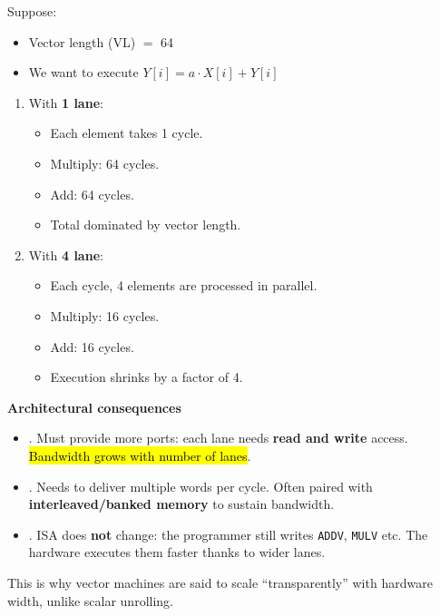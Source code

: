 \highspace
\begin{examplebox}
    Suppose:
    \begin{itemize}
        \item Vector length (VL) $=$ 64
        \item We want to execute $Y[i] = a \cdot X[i] + Y[i]$
    \end{itemize}
    \begin{enumerate}
        \item With \textbf{1 lane}:
        \begin{itemize}
            \item Each element takes 1 cycle.
            \item Multiply: 64 cycles.
            \item Add: 64 cycles.
            \item Total dominated by vector length.
        \end{itemize}
        \item With \textbf{4 lane}:
        \begin{itemize}
            \item Each cycle, 4 elements are processed in parallel.
            \item Multiply: 16 cycles.
            \item Add: 16 cycles.
            \item Execution shrinks by a factor of 4.
        \end{itemize}
    \end{enumerate}
\end{examplebox}

\newpage

\begin{flushleft}
    \textcolor{Green3}{ \textbf{Architectural consequences}}
\end{flushleft}
\begin{itemize}
    \item {}. Must provide more ports: each lane needs \textbf{read and write} access. \hl{Bandwidth grows with number of lanes}.
    \item {}. Needs to deliver multiple words per cycle. Often paired with \textbf{interleaved/banked memory} to sustain bandwidth.
    \item {}. ISA does \textbf{not} change: the programmer still writes \texttt{ADDV}, \texttt{MULV} etc. The hardware executes them faster thanks to wider lanes.
\end{itemize}
This is why vector machines are said to scale ``transparently'' with hardware width, unlike scalar unrolling.